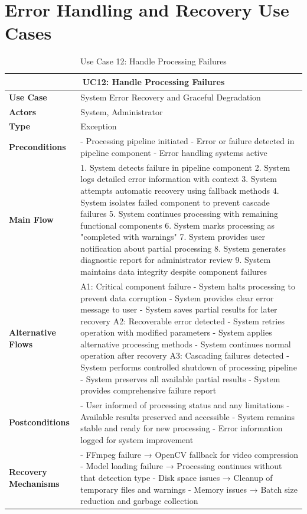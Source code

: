 \documentclass{article}
\begin{document}
\section{Error Handling and Recovery Use Cases}

\begin{table}[H]
\centering
\begin{tabularx}{\textwidth}{|l|X|}
\hline
\multicolumn{2}{|c|}{\textbf{UC12: Handle Processing Failures}} \\ \hline
\textbf{Use Case} & System Error Recovery and Graceful Degradation \\ \hline
\textbf{Actors} & System, Administrator \\ \hline
\textbf{Type} & Exception \\ \hline
\textbf{Preconditions} & 
- Processing pipeline initiated
- Error or failure detected in pipeline component
- Error handling systems active \\ \hline
\textbf{Main Flow} & 
1. System detects failure in pipeline component
2. System logs detailed error information with context
3. System attempts automatic recovery using fallback methods
4. System isolates failed component to prevent cascade failures
5. System continues processing with remaining functional components
6. System marks processing as "completed with warnings"
7. System provides user notification about partial processing
8. System generates diagnostic report for administrator review
9. System maintains data integrity despite component failures \\ \hline
\textbf{Alternative Flows} & 
A1: Critical component failure
- System halts processing to prevent data corruption
- System provides clear error message to user
- System saves partial results for later recovery
A2: Recoverable error detected
- System retries operation with modified parameters
- System applies alternative processing methods
- System continues normal operation after recovery
A3: Cascading failures detected
- System performs controlled shutdown of processing pipeline
- System preserves all available partial results
- System provides comprehensive failure report \\ \hline
\textbf{Postconditions} & 
- User informed of processing status and any limitations
- Available results preserved and accessible
- System remains stable and ready for new processing
- Error information logged for system improvement \\ \hline
\textbf{Recovery Mechanisms} & 
- FFmpeg failure → OpenCV fallback for video compression
- Model loading failure → Processing continues without that detection type
- Disk space issues → Cleanup of temporary files and warnings
- Memory issues → Batch size reduction and garbage collection \\ \hline
\end{tabularx}
\caption{Use Case 12: Handle Processing Failures}
\end{table}
\end{document}
